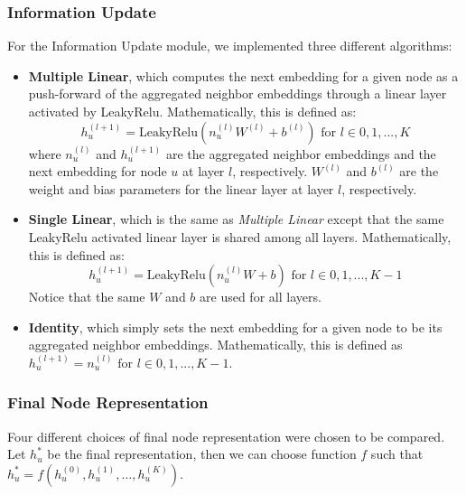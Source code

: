 \documentclass{article}
\begin{document}
\subsubsection{Information Update} \label{info_update}

For the Information Update module, we implemented three different algorithms:
\begin{itemize}
    \item \textbf{Multiple Linear}, which computes the next embedding for a given node as a push-forward of the aggregated neighbor embeddings through a linear layer activated by LeakyRelu. Mathematically, this is defined as:
    $$
    h_u^{(l+1)} = \mbox{LeakyRelu}(n_u^{(l)} W^{(l)} + b^{(l)}) \text{ for } l \in 0, 1, ..., K
    $$
    where $n_u^{(l)}$ and $h_u^{(l+1)}$ are the aggregated neighbor embeddings and the next embedding for node $u$ at layer $l$, respectively. $W^{(l)}$ and $b^{(l)}$ are the weight and bias parameters for the linear layer at layer $l$, respectively.
    \item \textbf{Single Linear}, which is the same as \textit{Multiple Linear} except that the same LeakyRelu activated linear layer is shared among all layers. Mathematically, this is defined as:
    $$
    h_u^{(l+1)} = \mbox{LeakyRelu}(n_u^{(l)} W + b) \text{ for } l \in 0, 1, ..., K - 1
    $$
    Notice that the same $W$ and $b$ are used for all layers.
    \item \textbf{Identity}, which simply sets the next embedding for a given node to be its aggregated neighbor embeddings. Mathematically, this is defined as
    $
    h_u^{(l+1)} = n_u^{(l)} \text{ for } l \in 0, 1, ..., K - 1
    $.
\end{itemize}

\subsubsection{Final Node Representation} \label{final_node_representation}

Four different choices of final node representation were chosen to be compared. Let $h_u^*$ be the final representation, then we can choose function $f$ such that $h_u^*=f(h_u^{(0)},h_u^{(1)},\hdots,h_u^{(K)})$.
\end{document}

